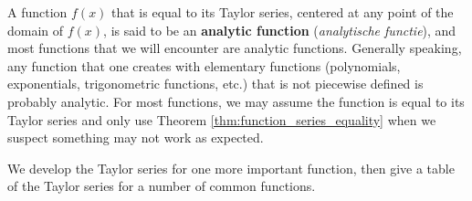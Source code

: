 A function $f(x)$ that is equal to its Taylor series, centered at any point of the domain of $f(x)$, is said to be an \textbf{analytic function} (\textit{analytische functie}), and most functions that we will encounter are analytic functions. Generally speaking, any function that one creates with elementary functions (polynomials, exponentials, trigonometric functions, etc.) that is not piecewise defined is probably analytic. For most functions, we may assume the function is equal to its Taylor series and only use Theorem \ref{thm:function_series_equality} when we suspect something may not work as expected.

We develop the Taylor series for one more important function, then give a table of the Taylor series for a number of common functions.

